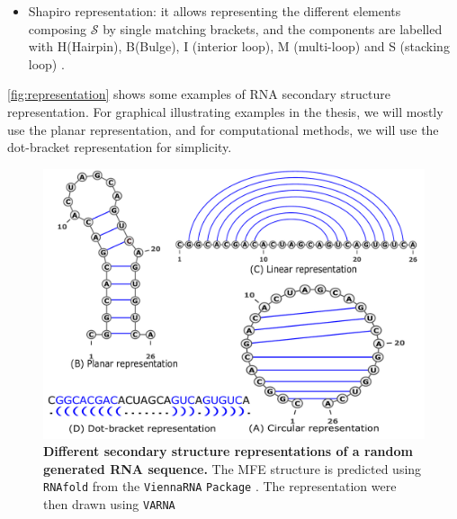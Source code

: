 \begin{mydef}
\begin{itemize}
		\item Shapiro representation: it allows representing the different elements composing $\mathcal{S}$  by single matching brackets, and the components are labelled with H(Hairpin), B(Bulge), I (interior loop), M (multi-loop) and S (stacking loop) \cite{shapiro1990comparing}.
	\end{itemize}
	\autoref{fig:representation} shows some examples of \ac{RNA} secondary structure representation. For graphical illustrating examples in the thesis, we will mostly use the planar representation, and for computational methods, we will use the dot-bracket representation for simplicity.  
	\begin{figure}[t!]
		\includegraphics[width=1. \linewidth]{../res/images/arnaque/rep.pdf}
		\caption{\textbf{Different secondary structure representations of a random generated \ac{RNA} sequence.} The \ac{MFE} structure is predicted using \texttt{RNAfold} from the \texttt{ViennaRNA} \texttt{Package} \cite{lorenz11_vienn_packag}. The representation were then drawn using \texttt{VARNA} \cite{darty09_varna} }\label{fig:representation}
	\end{figure}
\end{mydef}


